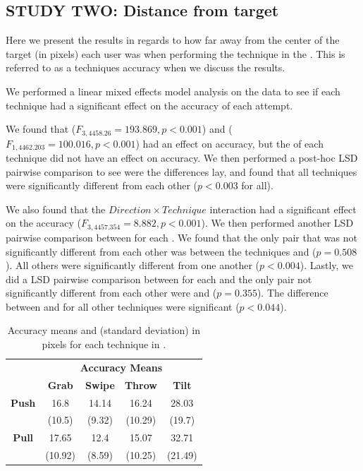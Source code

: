 \subsection{STUDY TWO: Distance from target}
Here we present the results in regards to how far away from the center of the target (in pixels) each user was when performing the technique in the \accuracy. 
This is referred to as a techniques accuracy when we discuss the results. 

We performed a linear mixed effects model analysis on the data to see if each technique had a significant effect on the accuracy of each attempt. 

We found that \technique ($F_{3,4458.26}=193.869, p<0.001$) and \targetsize ($F_{1,4462.203}=100.016, p<0.001$) had an effect on accuracy, but the \direction of each technique did not have an effect on accuracy. 
We then performed a post-hoc LSD pairwise comparison to see were the differences lay, and found that all techniques were significantly different from each other ($p<0.003$ for all).

We also found that the $Direction \times Technique$ interaction had a significant effect on the accuracy ($F_{3,4457.354}=8.882, p<0.001$).
We then performed another LSD pairwise comparison between \technique for each \direction. 
We found that the only pair that was not significantly different from each other was between the techniques \grab \push and \throw \push ($p=0.508$). 
All others were significantly different from one another ($p<0.004$). 
Lastly, we did a LSD pairwise comparison between \direction for each \technique and the only pair not significantly different from each other were \grab \push and \grab \pull ($p=0.355$).
The difference between \pull and \push for all other techniques were significant ($p<0.044$).

\begin{table}[H]
	\centering
	\def\arraystretch{1}
		\begin{tabular}{c c c c c}
			& \multicolumn{4}{c}{\textbf{Accuracy Means}} \B \\
			\cline{2-5}
			& \textbf{Grab} & \textbf{Swipe} & \textbf{Throw} & \textbf{Tilt} \T\B \\ \hline
			\textbf{Push} & 16.8 & 14.14 & 16.24 & 28.03 \T \\ 
			& (10.5) & (9.32) & (10.29) & (19.7) \B \\ \hline
			\textbf{Pull} & 17.65 & 12.4 & 15.07 & 32.71 \T \\
			& (10.92) & (8.59) & (10.25) & (21.49) \B \\ \hline
		\end{tabular}
	\caption{Accuracy means and (standard deviation) in pixels for each technique in \accuracy.}
	\label{tab:accuracy}
\end{table}

